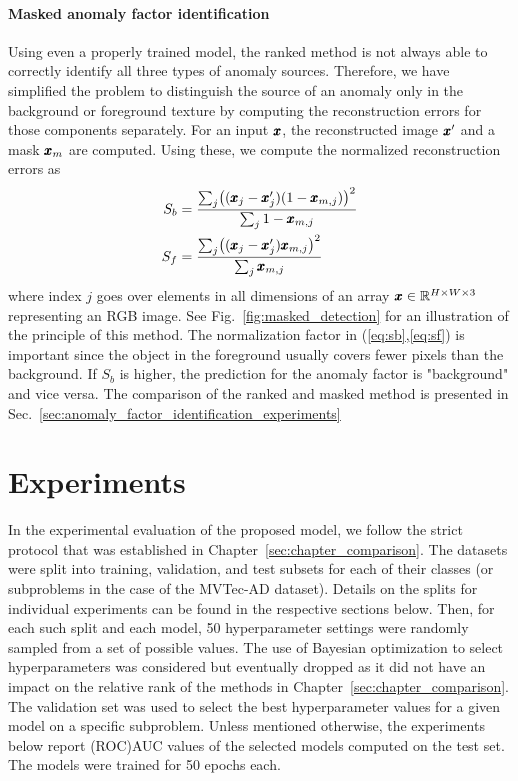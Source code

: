 \paragraph{Masked anomaly factor identification}
Using even a properly trained model, the ranked method is not always able to correctly identify all three types of anomaly sources. Therefore, we have simplified the problem to distinguish the source of an anomaly only in the background or foreground texture by computing the reconstruction errors for those components separately. For an input $\pmb{{x}}$, the reconstructed image $\pmb{{x}}'$ and a mask $\pmb{{x}}_m$ are computed. Using these, we compute the normalized reconstruction errors as
\begin{align}
    S_b & = \frac{\sum_j \left( (\vc{x}_j-\vc{x}_{j}') (1-\vc{x}_{m,j}) \right) ^ 2}{\sum_j 1-\vc{x}_{m,j}} \label{eq:sb} \\
    S_f & = \frac{\sum_j \left( (\vc{x}_j-\vc{x}_{j}') \vc{x}_{m,j} \right) ^ 2}{\sum_j \vc{x}_{m,j}}  \label{eq:sf}
\end{align}
where index $j$ goes over elements in all dimensions of an array $\pmb{{x}} \in \mathbb{R}^{H \times W \times 3}$ representing an RGB image. See Fig.~\ref{fig:masked_detection} for an illustration of the principle of this method. The normalization factor in (\ref{eq:sb},\ref{eq:sf}) is important since the object in the foreground usually covers fewer pixels than the background. If $S_b$ is higher, the prediction for the anomaly factor is "background" and vice versa. The comparison of the ranked and masked method is presented in Sec.~\ref{sec:anomaly_factor_identification_experiments}


\section{Experiments} \label{sec:experiments}

In the experimental evaluation of the proposed model, we follow the strict protocol that was established in Chapter~\ref{sec:chapter_comparison}. The datasets were split into training, validation, and test subsets for each of their classes (or subproblems in the case of the MVTec-AD dataset). Details on the splits for individual experiments can be found in the respective sections below. Then, for each such split and each model, 50 hyperparameter settings were randomly sampled from a set of possible values. The use of Bayesian optimization to select hyperparameters was considered but eventually dropped as it did not have an impact on the relative rank of the methods in Chapter~\ref{sec:chapter_comparison}. The validation set was used to select the best hyperparameter values for a given model on a specific subproblem. Unless mentioned otherwise, the experiments below report (ROC)AUC values of the selected models computed on the test set. The models were trained for 50 epochs each.

